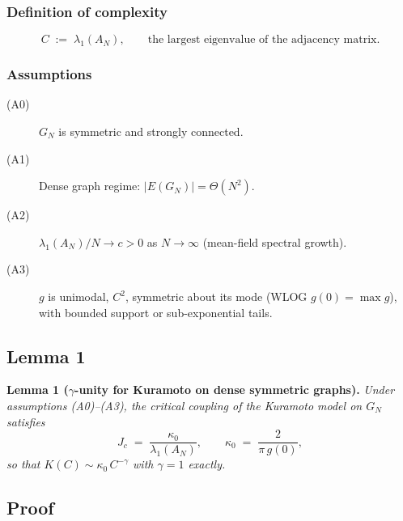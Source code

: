 \documentclass[11pt,a4paper,twocolumn]{article}
\begin{document}
\subsubsection{Definition of complexity}

\begin{equation}
C \;:=\; \lambda_1(A_N),
\qquad\text{the largest eigenvalue of the adjacency matrix.}
\label{eq:complexity-def}
\end{equation}

\subsubsection{Assumptions}

\begin{description}
\item[(A0)] $G_N$ is symmetric and strongly connected.
\item[(A1)] Dense graph regime: $|E(G_N)| = \Theta(N^2)$.
\item[(A2)] $\lambda_1(A_N)/N \to c > 0$ as $N \to \infty$ (mean-field spectral growth).
\item[(A3)] $g$ is unimodal, $C^2$, symmetric about its mode (WLOG $g(0) = \max g$), with bounded support or sub-exponential tails.
\end{description}

\subsection{Lemma 1}
\label{sec:lemma1-statement}

\textbf{Lemma 1 ($\gamma$-unity for Kuramoto on dense symmetric graphs).}
\emph{Under assumptions (A0)--(A3), the critical coupling of the Kuramoto model on $G_N$ satisfies}
\begin{equation}
J_c \;=\; \frac{\kappa_0}{\lambda_1(A_N)},
\qquad
\kappa_0 \;=\; \frac{2}{\pi\,g(0)},
\label{eq:lemma1}
\end{equation}
\emph{so that $K(C) \sim \kappa_0\,C^{-\gamma}$ with $\gamma = 1$ exactly.}

\subsection{Proof}
\label{sec:lemma1-proof}
\end{document}
